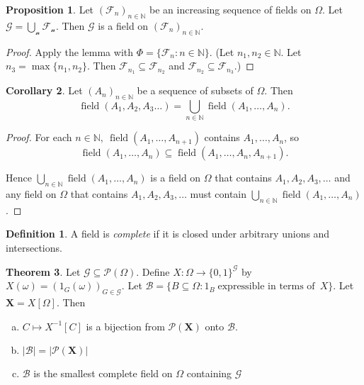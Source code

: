 \documentclass{article}
\DeclareMathOperator{\field}{field}
\newcommand{\N}{\mathbb{N}}
\newcommand{\F}{\mathscr{F}}
\DeclareMathOperator{\eit}{\text{expressible in terms of}}
\theoremstyle{definition}
\newtheorem{theorem}{Theorem}
\newtheorem{corollary}[theorem]{Corollary}
\newtheorem{proposition}[theorem]{Proposition}
\newtheorem*{definition}{Definition}
\begin{document}
\begin{proposition}
    Let $(\F_n)_{n \in \N}$ be an increasing sequence of fields on $\Omega$. Let $\mathscr{G = \bigcup_n \mathscr{F}_n}$. Then $\mathscr{G}$ is a field on $(\F_n)_{n \in \N}$.
\end{proposition}

\begin{proof}
    Apply the lemma with $\Phi = \{\F_n : n \in \N\}$. (Let $n_1,n_2 \in \N$. Let $n_3 = \max\{n_1,n_2\}$. Then $\mathscr{F}_{n_1} \subseteq \mathscr{F}_{n_2}$ and $\mathscr{F}_{n_2} \subseteq \mathscr{F}_{n_3}$.)
\end{proof}

\begin{corollary}
    Let $(A_n)_{n \in \N}$ be a sequence of subsets of $\Omega$. Then
    \[\field (A_1,A_2,A_3\dots) = \bigcup_{n \in \N} \field(A_1,\dots,A_n).\]
\end{corollary}

\begin{proof}
    For each $n \in \N,\ \field(A_1,\dots,A_{n+1})$ contains $A_1,\dots,A_n$, so $$\field(A_1,\dots,A_n) \subseteq \field(A_1,\dots,A_n, A_{n+1}).$$

    Hence $\bigcup_{n \in \N} \field(A_1,\dots,A_n)$ is a field on $\Omega$ that contains $A_1,A_2,A_3,\dots$ and any field on $\Omega$ that contains $A_1,A_2,A_3,\dots$ must contain $\bigcup_{n \in \N} \field(A_1,\dots,A_n)$.
\end{proof}

\begin{definition}
    A field is \textit{complete} if it is closed under arbitrary unions and intersections.
\end{definition}

\begin{theorem}
    Let $\mathscr{G} \subseteq \mathcal{P}(\Omega)$. Define $X: \Omega \to \{0,1\}^{\mathscr{G}}$ by $X(\omega) = (1_G (\omega))_{G \in \mathscr{G}}$. Let $\mathscr{B} = \{B \subseteq \Omega : 1_B \eit \ X\}$. Let $\mathbf{X} = X[\Omega]$. Then
    \begin{enumerate}[(a)]
        \item $C \mapsto X^{-1}[C]$ is a bijection from $\mathcal{P}(\mathbf{X})$ onto $\mathscr{B}$.
        \item $|\mathscr{B}| = |\mathcal{P}(\mathbf{X})|$
        \item $\mathscr{B}$ is the smallest complete field on $\Omega$ containing $\mathscr{G}$
    \end{enumerate}
\end{theorem}
\end{document}
